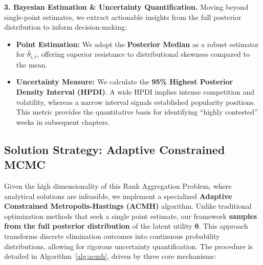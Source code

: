 \documentclass{mcmthesis}
\begin{document}
\noindent \textbf{3. Bayesian Estimation \& Uncertainty Quantification.} 
Moving beyond single-point estimates, we extract actionable insights from the full posterior distribution to inform decision-making:
\vspace{-0.4cm}
\begin{itemize}[leftmargin=*]
	\item \textbf{Point Estimation:} We adopt the \textbf{Posterior Median} as a robust estimator for $\hat{\theta}_{i,t}$, offering superior resistance to distributional skewness compared to the mean.
	\vspace{-0.4cm}
	\item \textbf{Uncertainty Measure:} We calculate the \textbf{95\% Highest Posterior Density Interval (HPDI)}. A wide HPDI implies intense competition and volatility, whereas a narrow interval signals established popularity positions. This metric provides the quantitative basis for identifying ``highly contested'' weeks in subsequent chapters.
\end{itemize}


\subsection{Solution Strategy: Adaptive Constrained MCMC}

Given the high dimensionality of this Rank Aggregation Problem, where analytical solutions are infeasible, we implement a specialized \textbf{Adaptive Constrained Metropolis-Hastings (ACMH)} algorithm. Unlike traditional optimization methods that seek a single point estimate, our framework \textbf{samples from the full posterior distribution} of the latent utility $\boldsymbol{\theta}$. This approach transforms discrete elimination outcomes into continuous probability distributions, allowing for rigorous uncertainty quantification. The procedure is detailed in Algorithm~\ref{alg:acmh}, driven by three core mechanisms:
\end{document}
